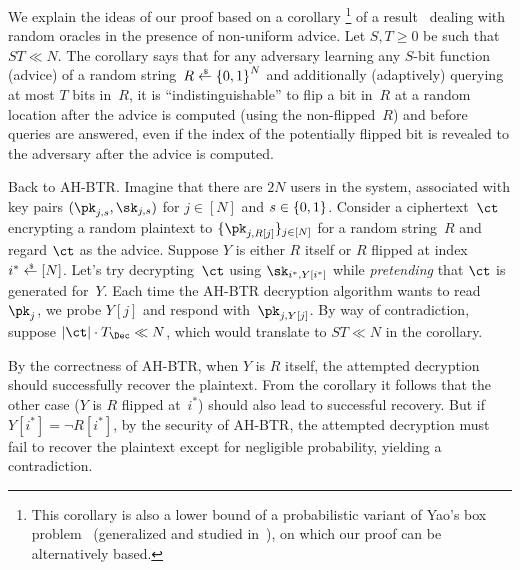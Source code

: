 We explain the ideas of our proof based on a corollary%
\footnote{This corollary is also a lower bound of a probabilistic variant of Yao's box problem~\cite{STOC:Yao90} (generalized and studied in~\cite{EC:CorHenKog22}), on which our proof can be alternatively based.
}
of a result~\cite{C:Unruh07} dealing with random oracles in the presence of non-uniform advice.
Let ${S,T\geq 0}$ be such that ${ST\ll N}$.
The corollary says that
for any adversary learning any $S$-bit function (advice) of a random string~${R\draws\bit^N}$ and additionally (adaptively) querying at most $T$ bits in~$R$,
it is ``indistinguishable'' to flip a bit in~$R$ at a random location
after the advice is computed (using the non-flipped~$R$) and
before queries are answered,
even if the index of the potentially flipped bit is revealed to the adversary after the advice is computed.

Back to AH-BTR\@. Imagine that there are $2N$ users in the system, associated with key pairs $(\pk_{j,s},\sk_{j,s})$ for ${j\in[N]}$ and ${s\in{\{0,1\}}}$.
Consider a ciphertext~$\ct$ encrypting a random plaintext to $\{\pk_{j,R[j]}\}_{j\in[N]}$ for a random string~$R$ and
regard $\ct$ as the advice.
Suppose $Y$ is either $R$ itself or $R$ flipped at index ${i^\ast\draws[N]}$.
Let's try decrypting~$\ct$ using $\sk_{i^\ast,Y[i^\ast]}$
while \emph{pretending} that $\ct$ is generated for~$Y$.
Each time the AH-BTR decryption algorithm wants to read~$\pk_j$,
we probe $Y[j]$ and respond with~$\pk_{j,Y[j]}$.
By way of contradiction, suppose ${|\ct|\cdot T_\Dec\ll N}$,
which would translate to ${ST\ll N}$ in the corollary.

By the correctness of AH-BTR, when $Y$ is $R$ itself,
the attempted decryption should successfully recover the plaintext.
From the corollary it follows that the other case
($Y$ is $R$ flipped at~$i^\ast$)
should also lead to successful recovery.
But if ${Y[i^\ast]=\neg R[i^\ast]}$,
by the security of AH-BTR,
the attempted decryption must fail to recover the plaintext except for negligible probability, yielding a contradiction.
